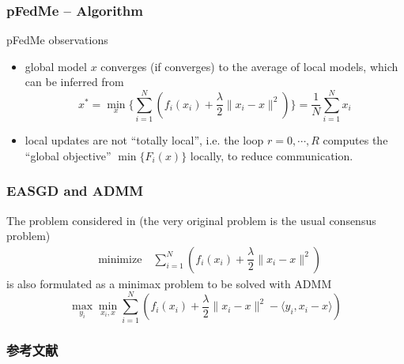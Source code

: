 \begin{frame}
\frametitle{pFedMe -- Algorithm}

\begin{block}{pFedMe observations}
\begin{itemize}
    \item global model $x$ converges (if converges) to the average of local models, which can be inferred from
    $$x^* = \min_{x} \{ \sum\limits_{i=1}^N \left( f_i(x_i) + \dfrac{\lambda}{2} \lVert x_i - x \rVert^2 \right) \} = \frac{1}{N} \sum\limits_{i=1}^N x_i$$
    \item local updates are not ``totally local'', i.e. the loop $r = 0, \cdots, R$ computes the ``global objective'' $\min\{F_i(x)\}$ locally, to reduce communication.
\end{itemize}
\end{block}

\end{frame}


\begin{frame}
\frametitle{EASGD and ADMM}

The problem considered in \cite{zhang2015easgd} (the very original problem is the usual consensus problem)
\begin{align*}
    & \text{minimize} \quad \sum\limits_{i=1}^N \left( f_i(x_i) + \dfrac{\lambda}{2} \lVert x_i - x \rVert^2 \right)
\end{align*}
is also formulated as a minimax problem to be solved with ADMM
$$\max_{y_i}\min_{x_i,x} \sum_{i=1}^N \left( f_i(x_i) + \dfrac{\lambda}{2} \lVert x_i - x \rVert^2 - \langle y_i, x_i-x \rangle \right)$$

\end{frame}


\begin{frame}[allowframebreaks]
\frametitle{参考文献}

{\footnotesize


}

\end{frame}


